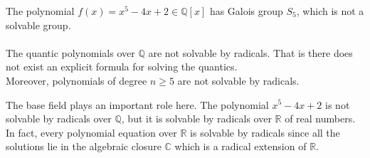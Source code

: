 The polynomial \(f(x)=x^5-4x+2 \in \mathbb{Q}[x]\) has Galois group \(S_5\), which is not a solvable group. \\ \\
The quantic polynomials over \(\mathbb{Q}\) are not solvable by radicals. That is there does not exist an explicit formula for solving the quantics. \\
Moreover, polynomials of degree \(n \geq 5\) are not solvable by radicals.

\begin{remark}
The base field plays an important role here. The polynomial \(x^5-4x+2\) is not solvable by radicals over \(\mathbb{Q}\), but it is solvable by radicals over \(\mathbb{R}\) of real numbers. In fact, every polynomial equation over \(\mathbb{R}\) is solvable by radicals since all the solutions lie in the algebraic closure \(\mathbb{C}\) which is a radical extension of \(\mathbb{R}\).
\end{remark}
